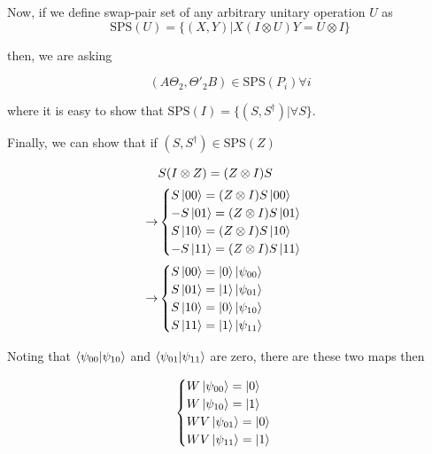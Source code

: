\documentclass{report}
\begin{document}
Now, if we define swap-pair set of any arbitrary unitary operation $U$ as
\begin{equation}
  \mathrm{SPS}(U) = \{ (X, Y) | X(I \otimes U)Y = U \otimes I \}
\end{equation}

then, we are asking

\begin{equation}
  (A \Theta_2, \Theta'_2 B) \in \mathrm{SPS}(P_i) \forall i
\end{equation}
  
where it is easy to show that $\mathrm{SPS}(I) = \{ (S, S^\dagger) | \forall S \}$.

Finally, we can show that if $(S, S^\dagger) \in \mathrm{SPS}(Z)$

\begin{equation}
  \begin{aligned}
  &S(I \otimes Z) = (Z \otimes I) S \\
  \rightarrow &\begin{cases}
    S\ket{00} = (Z \otimes I) S\ket{00} \\
    - S\ket{01} = (Z \otimes I) S\ket{01} \\
    S\ket{10} = (Z \otimes I) S\ket{10} \\
    - S\ket{11} = (Z \otimes I) S\ket{11}
  \end{cases} \\
  \rightarrow &\begin{cases}
    S\ket{00} = \ket{0}\ket{\psi_{00}} \\
    S\ket{01} = \ket{1}\ket{\psi_{01}} \\
    S\ket{10} = \ket{0}\ket{\psi_{10}} \\
    S\ket{11} = \ket{1}\ket{\psi_{11}}
  \end{cases} \\
  \end{aligned}
\end{equation}

Noting that $\braket{\psi_{00}}{\psi_{10}}$ and $\braket{\psi_{01}}{\psi_{11}}$ are zero, there are these two maps then

\begin{equation}
  \begin{cases}
  W\ket{\psi_{00}} = \ket{0} \\
  W\ket{\psi_{10}} = \ket{1} \\
  WV\ket{\psi_{01}} = \ket{0} \\
  WV\ket{\psi_{11}} = \ket{1}
  \end{cases}
\end{equation}
\end{document}
